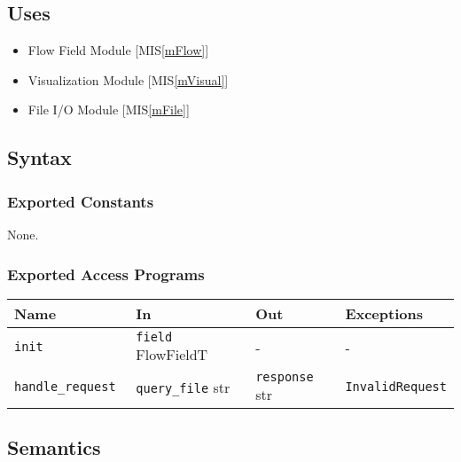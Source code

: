 \documentclass[12pt, titlepage]{article}
\begin{document}
\subsection{Uses}
\begin{itemize}
\item Flow Field Module [MIS\ref{mFlow}]
\item Visualization Module [MIS\ref{mVisual}]
\item File I/O Module [MIS\ref{mFile}]
\end{itemize}

\subsection{Syntax}

\subsubsection{Exported Constants}
None.

\subsubsection{Exported Access Programs}

\begin{center}
\begin{tabular}{p{3cm} p{4cm} p{4cm} p{4cm}}
\hline
\textbf{Name} & \textbf{In} & \textbf{Out} & \textbf{Exceptions} \\
\hline
\texttt{init}& \texttt{field} FlowFieldT & - & - \\
\texttt{handle\_request }& \texttt{query\_file} str & \texttt{response} str & \texttt{InvalidRequest} \\
\hline
\end{tabular}
\end{center}

\subsection{Semantics}
\end{document}
